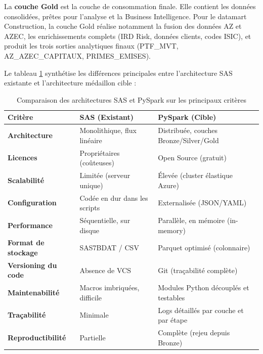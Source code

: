 La \textbf{couche Gold} est la couche de consommation finale. Elle contient les données consolidées, prêtes pour l'analyse et la Business Intelligence. Pour le datamart Construction, la couche Gold réalise notamment la fusion des données AZ et AZEC, les enrichissements complets (IRD Risk, données clients, codes ISIC), et produit les trois sorties analytiques finaux (PTF\_MVT, AZ\_AZEC\_CAPITAUX, PRIMES\_EMISES).

Le tableau \ref{tab:comparison} synthétise les différences principales entre l'architecture SAS existante et l'architecture médaillon cible :

\begin{table}[H]
    \centering
    \caption{Comparaison des architectures SAS et PySpark sur les principaux critères}
    \label{tab:comparison}
    \vspace{0.2cm}
    \begin{tabularx}{\textwidth}{@{}l X X@{}}
        \toprule
        \textbf{Critère} & \textbf{SAS (Existant)} & \textbf{PySpark (Cible)} \\
        \midrule
        \textbf{Architecture} & Monolithique, flux linéaire & Distribuée, couches Bronze/Silver/Gold \\
        \textbf{Licences} & Propriétaires (coûteuses) & Open Source (gratuit) \\
        \textbf{Scalabilité} & Limitée (serveur unique) & Élevée (cluster élastique Azure) \\
        \textbf{Configuration} & Codée en dur dans les scripts & Externalisée (JSON/YAML) \\
        \textbf{Performance} & Séquentielle, sur disque & Parallèle, en mémoire (in-memory) \\
        \textbf{Format de stockage} & SAS7BDAT / CSV & Parquet optimisé (colonnaire) \\
        \textbf{Versioning du code} & Absence de VCS & Git (traçabilité complète) \\
        \textbf{Maintenabilité} & Macros imbriquées, difficile & Modules Python découplés et testables \\
        \textbf{Traçabilité} & Minimale & Logs détaillés par couche et par étape \\
        \textbf{Reproductibilité} & Partielle & Complète (rejeu depuis Bronze) \\
        \bottomrule
    \end{tabularx}
\end{table}

